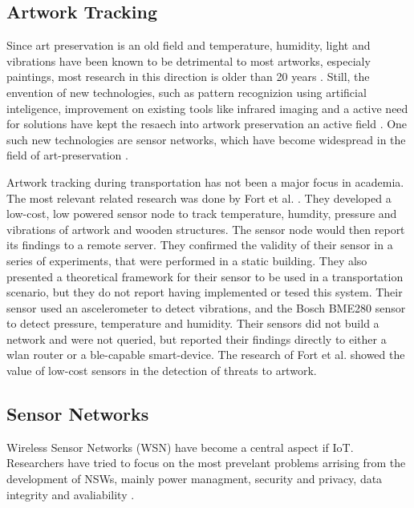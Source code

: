 \subsection{Artwork Tracking}


Since art preservation is an old field and temperature, humidity, light and vibrations have been known to be detrimental to most artworks, especialy paintings, most research in this direction is older than 20 years \cite{mecklenburg1991mechanical, michalski1991paintings, saunders2004effect}.
Still, the envention of new technologies, such as pattern recognizion using artificial inteligence, improvement on existing tools like infrared imaging and a active need for solutions have kept the resaech into artwork preservation an active field \cite{borg2020application, schito2017integrated}.
One such new technologies are sensor networks, which have become widespread in the field of art-preservation \cite{shah2016customized}.


Artwork tracking during transportation has not been a major focus in academia.
The most relevant related research was done by Fort et al. \cite{landi2022iot}.
They developed a low-cost, low powered sensor node to track temperature, humdity, pressure and vibrations of artwork and wooden structures.
The sensor node would then report its findings to a remote server.
They confirmed the validity of their sensor in a series of experiments, that were performed in a static building.
They also presented a theoretical framework for their sensor to be used in a transportation scenario, but they do not report having implemented or tesed this system.
Their sensor used an ascelerometer to detect vibrations, and the Bosch BME280 sensor to detect pressure, temperature and humidity.
Their sensors did not build a network and were not queried, but reported their findings directly to either a wlan router or a ble-capable smart-device.
The research of Fort et al. showed the value of low-cost sensors in the detection of threats to artwork.

\subsection{Sensor Networks}

Wireless Sensor Networks (WSN) have become a central aspect if IoT.
Researchers have tried to focus on the most prevelant problems arrising from the development of NSWs, mainly power managment, security and privacy, data integrity and avaliability \cite{gulati2022review}.


